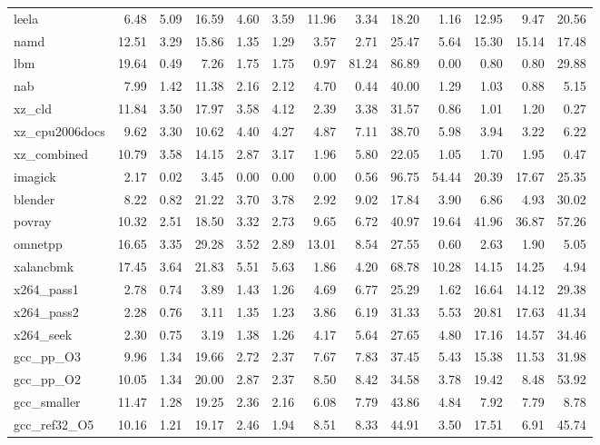 \documentclass[10pt,a4paper]{article}
\begin{document}
{\begin{longtable}{@{}lrrrrrrrrrrrr@{}}
leela & 6.48 & 5.09 & 16.59 & 4.60 & 3.59 & 11.96 & 3.34 & 18.20 & 1.16 & 12.95 & 9.47 & 20.56 \\
namd & 12.51 & 3.29 & 15.86 & 1.35 & 1.29 & 3.57 & 2.71 & 25.47 & 5.64 & 15.30 & 15.14 & 17.48 \\
lbm & 19.64 & 0.49 & 7.26 & 1.75 & 1.75 & 0.97 & 81.24 & 86.89 & 0.00 & 0.80 & 0.80 & 29.88 \\
nab & 7.99 & 1.42 & 11.38 & 2.16 & 2.12 & 4.70 & 0.44 & 40.00 & 1.29 & 1.03 & 0.88 & 5.15 \\
xz\_cld & 11.84 & 3.50 & 17.97 & 3.58 & 4.12 & 2.39 & 3.38 & 31.57 & 0.86 & 1.01 & 1.20 & 0.27 \\
xz\_cpu2006docs & 9.62 & 3.30 & 10.62 & 4.40 & 4.27 & 4.87 & 7.11 & 38.70 & 5.98 & 3.94 & 3.22 & 6.22 \\
xz\_combined & 10.79 & 3.58 & 14.15 & 2.87 & 3.17 & 1.96 & 5.80 & 22.05 & 1.05 & 1.70 & 1.95 & 0.47 \\
imagick & 2.17 & 0.02 & 3.45 & 0.00 & 0.00 & 0.00 & 0.56 & 96.75 & 54.44 & 20.39 & 17.67 & 25.35 \\
blender & 8.22 & 0.82 & 21.22 & 3.70 & 3.78 & 2.92 & 9.02 & 17.84 & 3.90 & 6.86 & 4.93 & 30.02 \\
povray & 10.32 & 2.51 & 18.50 & 3.32 & 2.73 & 9.65 & 6.72 & 40.97 & 19.64 & 41.96 & 36.87 & 57.26 \\
omnetpp & 16.65 & 3.35 & 29.28 & 3.52 & 2.89 & 13.01 & 8.54 & 27.55 & 0.60 & 2.63 & 1.90 & 5.05 \\
xalancbmk & 17.45 & 3.64 & 21.83 & 5.51 & 5.63 & 1.86 & 4.20 & 68.78 & 10.28 & 14.15 & 14.25 & 4.94 \\
x264\_pass1 & 2.78 & 0.74 & 3.89 & 1.43 & 1.26 & 4.69 & 6.77 & 25.29 & 1.62 & 16.64 & 14.12 & 29.38 \\
x264\_pass2 & 2.28 & 0.76 & 3.11 & 1.35 & 1.23 & 3.86 & 6.19 & 31.33 & 5.53 & 20.81 & 17.63 & 41.34 \\
x264\_seek & 2.30 & 0.75 & 3.19 & 1.38 & 1.26 & 4.17 & 5.64 & 27.65 & 4.80 & 17.16 & 14.57 & 34.46 \\
gcc\_pp\_O3 & 9.96 & 1.34 & 19.66 & 2.72 & 2.37 & 7.67 & 7.83 & 37.45 & 5.43 & 15.38 & 11.53 & 31.98 \\
gcc\_pp\_O2 & 10.05 & 1.34 & 20.00 & 2.87 & 2.37 & 8.50 & 8.42 & 34.58 & 3.78 & 19.42 & 8.48 & 53.92 \\
gcc\_smaller & 11.47 & 1.28 & 19.25 & 2.36 & 2.16 & 6.08 & 7.79 & 43.86 & 4.84 & 7.92 & 7.79 & 8.78 \\
gcc\_ref32\_O5 & 10.16 & 1.21 & 19.17 & 2.46 & 1.94 & 8.51 & 8.33 & 44.91 & 3.50 & 17.51 & 6.91 & 45.74 \\

\end{longtable}}
\end{document}
